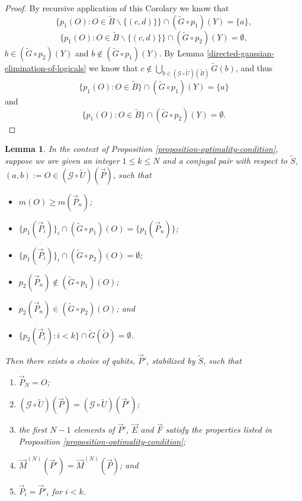 \documentclass[twocolumn,showpacs,preprintnumbers,amsmath,amssymb,nofootinbib,pra,floatfix]{revtex4-1}
\newtheorem{lemma}{Lemma}
\newcommand{\lst}{\vec}
\newcommand{\set}{\tilde}
\newcommand{\genfun}{\mathcal{G}}
\begin{document}
\begin{proof}
By recursive application of this Corolary we know that
$$\{p_1(O):O\in\set B\backslash\{(c,d)\}\}\cap (\set G\circ p_1)(Y)=\{a\},$$
$$\{p_1(O):O\in\set B\backslash\{(c,d)\}\}\cap (\set G\circ p_2)(Y)=\emptyset,$$
$b\in (\set G \circ p_2)(Y)$ and $b\notin (\set G\circ p_1)(Y)$.  By Lemma \ref{directed-gaussian-elimination-of-logicals} we know that $c\notin \bigcup_{b\in(\genfun\circ\set U)(\set B)} \set G(b)$, and thus 
$$\{p_1(O):O\in\set B\}\cap (\set G\circ p_1)(Y)=\{a\}$$
and
$$\{p_1(O):O\in\set B\}\cap (\set G\circ p_2)(Y)=\emptyset.$$
\end{proof}
\begin{lemma}
In the context of Proposition \ref{proposition-optimality-condition}, suppose we are given an integer $1\le k\le N$ and a conjugal pair with respect to $\set S$, $(a,b):=O\in(\genfun\circ\set U)(\lst P)$, such that
\begin{itemize}
\item $m(O)\ge m(\lst P_n)$;
\item $\{p_1(\lst P_i)\}_i\cap (\set G\circ p_1)(O)=\{p_1(\lst P_n)\}$;
\item $\{p_1(\lst P_i)\}_i\cap (\set G\circ p_2)(O)=\emptyset$;
\item $p_2(\lst P_n)\notin (\set G\circ p_1)(O)$;
\item $p_2(\lst P_n)\in (\set G\circ p_2)(O)$; and
\item $\{p_2(\lst P_i):i<k\}\cap \set G(\set O)=\emptyset$.
\end{itemize}
Then there exists a choice of qubits, $\lst P'$, stabilized by $\set S$, such that
\begin{enumerate}
\item $\lst P_N=O$;
\item $(\genfun\circ\set U)(\lst P)=(\genfun\circ\set U)(\lst P')$;
\item the first $N-1$ elements of $\lst P'$, $\lst E$ and $\lst F$ satisfy the properties listed in Proposition \ref{proposition-optimality-condition};
\item $\lst M^{(N)}(\lst P')=\lst M^{(N)}(\lst P)$; and
\item $\lst P_i=\lst P'_i$ for $i<k$.
\end{enumerate}
\end{lemma}
\end{document}
